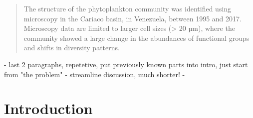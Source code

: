 \documentclass[draft]{agujournal2019}
\begin{document}
%
%

%
%


\begin{abstract}
The structure of the phytoplankton community was identified using microscopy in the Cariaco basin, in Venezuela, between 1995 and 2017. Microscopy data are limited to larger cell sizes (> 20 µm), where the community showed a large change in the abundances of functional groups and shifts in diversity patterns. 
\end{abstract}




- last 2 paragraphs, repetetive, put previously known parts into intro, just start from "the problem"
- streamline discussion, much shorter!
- 


\section{Introduction}
%
\end{document}

